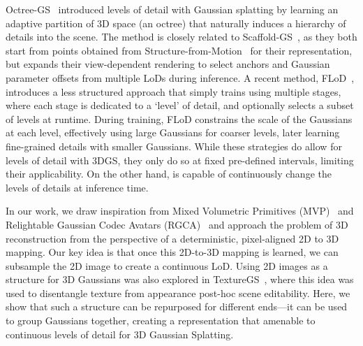     Octree-GS~\cite{ren2024octree} introduced levels of detail with Gaussian
    splatting by learning an adaptive partition of 3D space (an octree) that
    naturally induces a hierarchy of details into the scene.
    The method is closely related to Scaffold-GS~\cite{lu2024scaffold}, as they
    both start from points obtained from
    Structure-from-Motion~\cite{schonberger2016structure} for their
    representation, but expands their view-dependent rendering to select anchors
    and Gaussian parameter offsets from multiple LoDs during inference.
    A recent method, FLoD~\cite{seo2024flod}, introduces a less structured
    approach that simply trains using multiple stages, where each stage is
    dedicated to a `level' of detail, and optionally selects a subset of levels at
    runtime.
    During training, FLoD constrains the scale of the Gaussians at each level,
    effectively using large Gaussians for coarser levels, later learning
    fine-grained details with smaller Gaussians.
    While these strategies do allow for levels of detail with 3DGS, they only do
    so at fixed pre-defined intervals, limiting their applicability.
    On the other hand, \clog is capable of continuously change the levels of
    details at inference time.

    In our work, we draw inspiration from Mixed Volumetric Primitives
    (MVP)~\cite{raj2021pixel,lombardi2021mixture} and Relightable Gaussian Codec
    Avatars (RGCA)~\cite{saito2024relightable} and approach the problem of 3D
    reconstruction from the perspective of a deterministic, pixel-aligned 2D to 3D
    mapping.
    Our key idea is that once this 2D-to-3D mapping is learned, we can subsample
    the 2D image to create a continuous LoD.
    Using 2D images as a structure for 3D Gaussians was also explored in
    TextureGS~\cite{xu2024texturegs}, where this idea was used to disentangle
    texture from appearance post-hoc scene editability.
    Here, we show that such a structure can be repurposed for different ends---it
    can be used to group Gaussians together, creating a representation that
    amenable to continuous levels of detail for 3D Gaussian Splatting.
